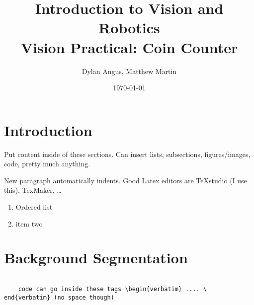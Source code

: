 \documentclass[12pt]{article}
\title{Introduction to Vision and Robotics\\Vision Practical: Coin Counter}
\author{Dylan Angus, Matthew Martin}
\date{\today}
\begin{document}
	
\maketitle

\section{Introduction}

Put content inside of these sections. Can insert lists, subsections, figures/images, code, pretty much anything.

New paragraph automatically indents. Good Latex editors are TeXstudio (I use this), TexMaker, \dots

\begin{enumerate}
	\item Ordered list
	\item item two
\end{enumerate}

\section{Background Segmentation}

\begin{verbatim}
	
	code can go inside these tags \begin{verbatim} .... \ end{verbatim} (no space though)
	
\end{verbatim}
\end{document}
